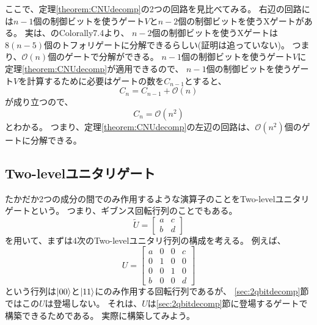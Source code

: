 ここで、定理\ref{theorem:CNUdecomp}の2つの回路を見比べてみる。
右辺の回路には$n-1$個の制御ビットを使うゲート$V$と$n-2$個の制御ビットを使うXゲートがある。
実は、\cite{barenco1995elementary}のColorally7.4より、
$n-2$個の制御ビットを使うXゲートは$8(n-5)$個のトフォリゲートに分解できるらしい(証明は追っていない)。
つまり、$\mathcal{O}(n)$個のゲートで分解ができる。
$n-1$個の制御ビットを使うゲート$V$に定理\ref{theorem:CNUdecomp}が適用できるので、
$n-1$個の制御ビットを使うゲート$V$を計算するために必要はゲートの数を$C_{n-1}$とすると、
\begin{equation}
  C_n = C_{n-1} + \mathcal{O}(n)
\end{equation}
が成り立つので、
\begin{equation}
  C_n = \mathcal{O}(n^2)
\end{equation}
とわかる。
つまり、定理\ref{theorem:CNUdecomp}の左辺の回路は、$\mathcal{O}(n^2)$個のゲートに分解できる。

\subsection{Two-levelユニタリゲート}
たかだか2つの成分の間でのみ作用するような演算子のことをTwo-levelユニタリゲートという。
つまり、ギブンス回転行列のことでもある。
\begin{equation}
  \tilde{U} =
  \begin{bmatrix}
    a & c \\
    b & d
  \end{bmatrix}
\end{equation}
を用いて、まずは4次のTwo-levelユニタリ行列の構成を考える。
例えば、
\begin{equation}
  U =
  \begin{bmatrix}
    a & 0 & 0 & c \\
    0 & 1 & 0 & 0 \\
    0 & 0 & 1 & 0 \\
    b & 0 & 0 & d
  \end{bmatrix}
\end{equation}
という行列は$\ket{00}$と$\ket{11}$にのみ作用する回転行列であるが、
\ref{sec:2qbitdecomp}節ではこの$U$は登場しない。
それは、$U$は\ref{sec:2qbitdecomp}節に登場するゲートで構築できるためである。
実際に構築してみよう。

